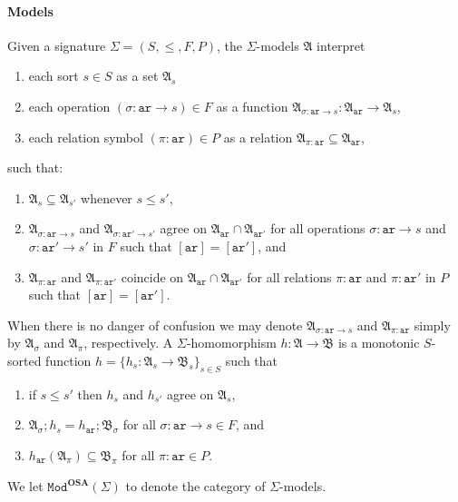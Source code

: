 \documentclass{article}
\newcommand{\OSA}{{\mathbf{OSA}}}
\newcommand{\Mod}{\mathtt{Mod}}
\newcommand{\A}{\mathfrak{A}}
\newcommand{\B}{\mathfrak{B}}
\newcommand{\ari}{\mathtt{ar}}
\begin{document}
\paragraph{Models}
Given a signature $\Sigma = (S, \leq, F, P)$, the $\Sigma$-models $\A$ interpret
\begin{enumerate}

\item each sort $s\in S$ as a set $\A_s$

\item each operation $(\sigma:\ari\to s)\in F$ as a function $\A_{\sigma:\ari\to s}\colon\A_\ari\to \A_s$,

\item each relation symbol $(\pi:\ari)\in P$ as a relation $\A_{\pi:\ari}\subseteq \A_\ari$, 

\end{enumerate}
such that:
\begin{enumerate}
 \item $\A_s\subseteq \A_{s'}$ whenever $s\leq s'$,

 \item $\A_{\sigma:\ari\to s}  $ and $ \A_{\sigma:\ari'\to s'}$ agree on $\A_\ari\cap \A_{\ari'}$ for all operations $\sigma:\ari\to s$ and $\sigma:\ari'\to s'$ in $F$ such that $[\ari]=[\ari']$, and
 \item $\A_{\pi:\ari}$ and $\A_{\pi:\ari'}$ coincide on \(\A_{\ari} \cap \A_{\ari'}\) for all relations $\pi:\ari$ and $\pi:\ari'$ in $P$ such that $[\ari]=[\ari']$.
\end{enumerate}
When there is no danger of confusion we may denote $\A_{\sigma:\ari\to s}$ and $\A_{\pi:\ari}$ simply by $\A_\sigma$ and $\A_\pi$, respectively.
A $\Sigma$-homomorphism $h:\A\to \B$ is a monotonic $S$-sorted function $h=\{h_s:\A_s\to \B_s\}_{s\in S}$ such that

\begin{enumerate}

\item if $s\leq s'$ then $h_s$ and $h_{s'}$ agree on $\A_s$,
  
\item $\A_\sigma ; h_s = h_\ari ; \B_\sigma$ for all $\sigma\colon\ari\to s\in F$, and

\item $h_\ari(\A_\pi)\subseteq \B_\pi$ for all $\pi\colon\ari \in P$.
\end{enumerate}
We let $\Mod^\OSA(\Sigma)$ to denote the category of $\Sigma$-models.
\end{document}
